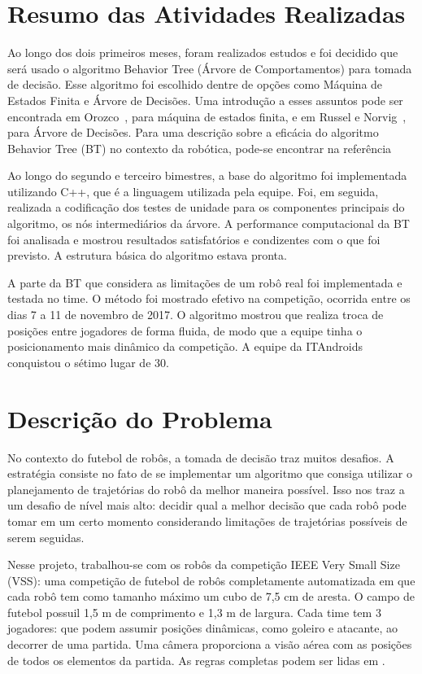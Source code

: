 \documentclass[a4paper,12pt]{article}
\begin{document}
\section{Resumo das Atividades Realizadas}
\label{secao:atividades_realizadas}

Ao longo dos dois primeiros meses, foram realizados estudos e foi decidido que será usado o algoritmo Behavior Tree (Árvore de Comportamentos) para tomada de decisão. Esse algoritmo foi escolhido dentre de opções como Máquina de Estados Finita e Árvore de Decisões. Uma introdução a esses assuntos pode ser encontrada em Orozco~\cite{orozcomaquinas}, para máquina de estados finita, e em Russel e Norvig~\cite{decision_tree}, para Árvore de Decisões. Para uma descrição sobre a eficácia do algoritmo Behavior Tree (BT) no contexto da robótica, pode-se encontrar na referência \cite{behavior_tree_robotics}

Ao longo do segundo e terceiro bimestres, a base do algoritmo foi implementada utilizando C++, que é a linguagem utilizada pela equipe. Foi, em seguida, realizada a codificação dos testes de unidade para os componentes principais do algoritmo, os nós intermediários da árvore. A performance computacional da BT foi analisada e mostrou resultados satisfatórios e condizentes com o que foi previsto. A estrutura básica do algoritmo estava pronta.

A parte da BT que considera as limitações de um robô real foi implementada e testada no time. 
O método  foi mostrado efetivo na competição, ocorrida entre os dias 7 a 11 de novembro de 2017. O algoritmo mostrou que realiza troca de posições entre jogadores de forma fluida, de modo que a equipe tinha o posicionamento mais dinâmico da competição. A equipe da ITAndroids conquistou o sétimo lugar de 30.

\section{Descrição do Problema}
\label{secao:enunciado_problema}

No contexto do futebol de robôs, a tomada de decisão traz muitos desafios. A estratégia consiste no fato de se implementar um algoritmo que consiga utilizar o planejamento de trajetórias do robô da melhor maneira possível. Isso nos traz a um desafio de nível mais alto: decidir qual a melhor decisão que cada robô pode tomar em um certo momento considerando limitações de trajetórias possíveis de serem seguidas.

Nesse projeto, trabalhou-se com os robôs da competição IEEE Very Small Size (VSS): uma competição de futebol de robôs completamente automatizada em que cada robô tem como tamanho máximo um cubo de 7,5 cm de aresta. O campo de futebol possuil 1,5 m de comprimento e 1,3 m de largura. Cada time tem 3 jogadores: que podem assumir posições dinâmicas, como goleiro e atacante, ao decorrer de uma partida. Uma câmera proporciona a visão aérea com as posições de todos os elementos da partida. As regras completas podem ser lidas em \cite{cbr2008}.
\end{document}
